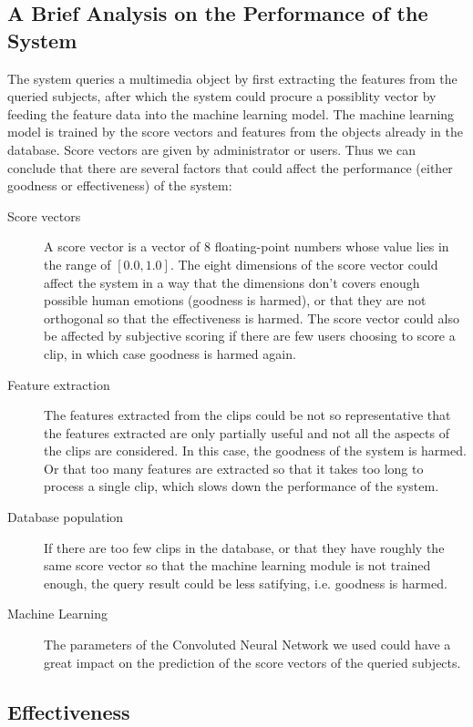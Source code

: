 \documentclass{report}
\begin{document}
\subsection{A Brief Analysis on the Performance of the System}

The system queries a multimedia object by first extracting the features from the queried subjects, after which the system could procure a possiblity vector by feeding the feature data into the machine learning model. The machine learning model is trained by the score vectors and features from the objects already in the database. Score vectors are given by administrator or users. Thus we can conclude that there are several factors that could affect the performance (either goodness or effectiveness) of the system:
\begin{description}
\item[Score vectors] A score vector is a vector of 8 floating-point numbers whose value lies in the range of $[0.0, 1.0]$. The eight dimensions of the score vector could affect the system in a way that the dimensions don't covers enough possible human emotions (goodness is harmed), or that they are not orthogonal so that the effectiveness is harmed. The score vector could also be affected by subjective scoring if there are few users choosing to score a clip, in which case goodness is harmed again.
\item[Feature extraction] The features extracted from the clips could be not so representative that the features extracted are only partially useful and not all the aspects of the clips are considered. In this case, the goodness of the system is harmed. Or that too many features are extracted so that it takes too long to process a single clip, which slows down the performance of the system.
\item[Database population] If there are too few clips in the database, or that they have roughly the same score vector so that the machine learning module is not trained enough, the query result could be less satifying, i.e. goodness is harmed.
\item[Machine Learning] The parameters of the Convoluted Neural Network we used could have a great impact on the prediction of the score vectors of the queried subjects.
\end{description}

\subsection{Effectiveness}
\end{document}
